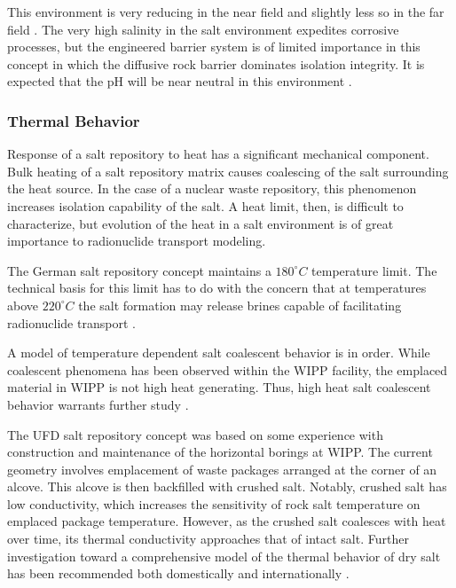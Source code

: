 This environment is very reducing in the near field and slightly less so in 
the far field \cite{clayton_generic_2011}. The very high salinity in the salt
environment expedites corrosive processes, but the engineered barrier system 
is of limited importance in this concept in which the diffusive rock barrier 
dominates isolation integrity.  It is expected that the pH will be near
neutral in this environment \cite{von_lensa_red-impact_2008, clayton_generic_2011}.

\subsubsection{Thermal Behavior}
\label{subsec:saltthermal}

Response of a salt repository to heat has a significant
mechanical component. Bulk heating of a salt repository matrix causes
coalescing  of the salt surrounding the heat source. In the case of a nuclear
waste repository, this phenomenon increases isolation capability of the salt. A
heat limit, then, is difficult to characterize, but evolution of the heat in a
salt environment is of great importance to radionuclide transport modeling. 

The German salt repository concept maintains a $180^\circ C$ temperature limit. 
The technical basis for this limit has to do with the concern that at
temperatures above $220^\circ C$ the salt formation may release brines capable 
of facilitating radionuclide transport 
\cite{von_lensa_red-impact_2008, brewitz_long-term_2002}.

A model of temperature dependent salt coalescent behavior is in order. While 
coalescent phenomena has been observed within the \gls{WIPP} facility, the 
emplaced material in \gls{WIPP} is not high heat generating. Thus, high heat 
salt coalescent behavior warrants further study \cite{carter_disposal_2011}.

The \gls{UFD} salt repository concept was based on some experience with 
construction and maintenance of the horizontal borings at WIPP. The 
current geometry involves emplacement of waste packages arranged at the corner 
of an alcove. This alcove is then backfilled with crushed salt. Notably, crushed salt 
has low conductivity, which increases the sensitivity of rock salt temperature 
on emplaced package temperature. However, as the crushed salt coalesces with 
heat over time, its thermal conductivity approaches that of intact salt. Further 
investigation toward a comprehensive model of the thermal behavior of dry salt 
has been recommended both domestically and internationally 
\cite{carter_disposal_2011}. 


